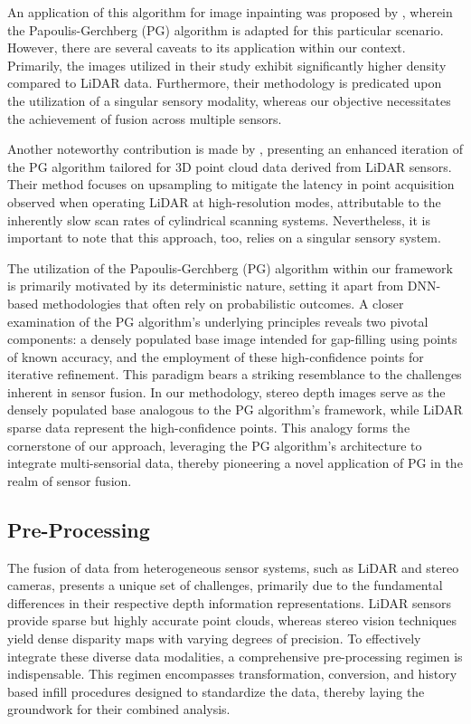 \documentclass[conference]{IEEEtran}
\begin{document}
An application of this algorithm for image inpainting was proposed by \cite{pg-image-inpaint-2009}, wherein the Papoulis-Gerchberg (PG) algorithm is adapted for this particular scenario. However, there are several caveats to its application within our context. Primarily, the images utilized in their study exhibit significantly higher density compared to LiDAR data. Furthermore, their methodology is predicated upon the utilization of a singular sensory modality, whereas our objective necessitates the achievement of fusion across multiple sensors.

Another noteworthy contribution is made by \cite{ozbay2015high}, presenting an enhanced iteration of the PG algorithm tailored for 3D point cloud data derived from LiDAR sensors. Their method focuses on upsampling to mitigate the latency in point acquisition observed when operating LiDAR at high-resolution modes, attributable to the inherently slow scan rates of cylindrical scanning systems. Nevertheless, it is important to note that this approach, too, relies on a singular sensory system.

The utilization of the Papoulis-Gerchberg (PG) algorithm within our framework is primarily motivated by its deterministic nature, setting it apart from DNN-based methodologies that often rely on probabilistic outcomes. A closer examination of the PG algorithm's underlying principles reveals two pivotal components: a densely populated base image intended for gap-filling using points of known accuracy, and the employment of these high-confidence points for iterative refinement. This paradigm bears a striking resemblance to the challenges inherent in sensor fusion. In our methodology, stereo depth images serve as the densely populated base analogous to the PG algorithm's framework, while LiDAR sparse data represent the high-confidence points. This analogy forms the cornerstone of our approach, leveraging the PG algorithm's architecture to integrate multi-sensorial data, thereby pioneering a novel application of PG in the realm of sensor fusion.

\subsection{Pre-Processing}

The fusion of data from heterogeneous sensor systems, such as LiDAR and stereo cameras, presents a unique set of challenges, primarily due to the fundamental differences in their respective depth information representations. LiDAR sensors provide sparse but highly accurate point clouds, whereas stereo vision techniques yield dense disparity maps with varying degrees of precision. To effectively integrate these diverse data modalities, a comprehensive pre-processing regimen is indispensable. This regimen encompasses transformation, conversion, and history based infill procedures designed to standardize the data, thereby laying the groundwork for their combined analysis.
\end{document}
